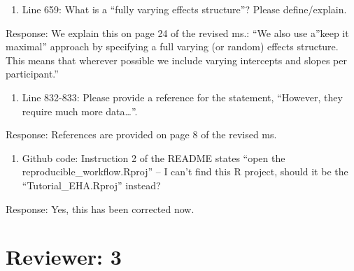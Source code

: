 \documentclass[
]{article}
\providecommand{\tightlist}{%
  \setlength{\itemsep}{0pt}\setlength{\parskip}{0pt}}
\renewenvironment{quote}{\begin{leftbar}}{\end{leftbar}}
\begin{document}
\begin{quote}
\begin{enumerate}
\def\labelenumi{\arabic{enumi}.}
\setcounter{enumi}{14}
\tightlist
\item
  Line 659: What is a ``fully varying effects structure''? Please
  define/explain.
\end{enumerate}
\end{quote}

Response: We explain this on page 24 of the revised ms.: ``We also use
a''keep it maximal'' approach by specifying a full varying (or random)
effects structure. This means that wherever possible we include varying
intercepts and slopes per participant.''

\begin{quote}
\begin{enumerate}
\def\labelenumi{\arabic{enumi}.}
\setcounter{enumi}{15}
\tightlist
\item
  Line 832-833: Please provide a reference for the statement, ``However,
  they require much more data\ldots{}''.
\end{enumerate}
\end{quote}

Response: References are provided on page 8 of the revised ms.

\begin{quote}
\begin{enumerate}
\def\labelenumi{\arabic{enumi}.}
\setcounter{enumi}{16}
\tightlist
\item
  Github code: Instruction 2 of the README states ``open the
  reproducible\_workflow.Rproj'' -- I can't find this R project, should
  it be the ``Tutorial\_EHA.Rproj'' instead?
\end{enumerate}
\end{quote}

Response: Yes, this has been corrected now.

\section{Reviewer: 3}\label{reviewer-3}
\end{document}
